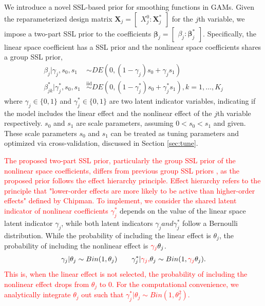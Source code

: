 \documentclass[AMA,STIX1COL,]{WileyNJD-v2}
\begin{document}
We introduce a novel SSL-based prior for smoothing functions in GAMs.
Given the reparameterized design matrix
\(\boldsymbol{X}_j = \begin{bmatrix} X^0_j : \boldsymbol{X}_j^*\end{bmatrix}\)
for the \(j\)th variable, we impose a two-part SSL prior to the
coefficients
\(\boldsymbol{\beta}_j = \begin{bmatrix} \beta_j : \boldsymbol{\beta}_j^*\end{bmatrix}\).
Specifically, the linear space coefficient has a SSL prior and the
nonlinear space coefficients shares a group SSL prior,
\begin{align}\label{eq:bham_ssl}
  \beta_{j} | \gamma_{j},s_0,s_1 &\sim DE(0,(1-\gamma_{j}) s_0 + \gamma_{j} s_1) \nonumber \\
  \beta^*_{jk} | \gamma^*_{j},s_0,s_1 &\overset{\text{iid}}{\sim}DE(0,(1-\gamma^*_{j}) s_0 + \gamma^*_{j} s_1), k=1,\dots, K_j
\end{align} where \(\gamma_{j}\in\{0,1\}\) and
\(\gamma^*_{j}\in \{0,1\}\) are two latent indicator variables,
indicating if the model includes the linear effect and the nonlinear
effect of the \(j\)th variable respectively. \(s_0\) and \(s_1\) are
scale parameters, assuming \(0 < s_0 < s_1\) and given. These scale
parameters \(s_0\) and \(s_1\) can be treated as tuning parameters and
optimized via cross-validation, discussed in Section \ref{sec:tune}.

\textcolor{red}{The proposed two-part SSL prior, particularly the group SSL prior of the nonlinear space coefficients, differs from previous group SSL priors \cite{Tang2018, Tang2019}, as the proposed prior follows the effect hierarchy principle. Effect hierarchy refers to the principle that "lower-order effects are more likely to be active than higher-order effects" defined by Chipman\cite{chipman2006prior}. To implement, we consider the shared latent indicator of nonlinear coefficients $\gamma^*_j$}
depends on the value of the linear space latent indicator \(\gamma_j\),
while both latent indicators \(\gamma_j and \gamma^*_j\) follow a
Bernoulli distribution. While the probability of including the linear
effect is \(\theta_j\), the probability of including the nonlinear
effect is \(\textcolor{red}{\gamma_{j}}\theta_j\). \[
\begin{aligned}
&\gamma_{j} | \theta_j \sim Bin(1, \theta_j) & & 
&\gamma_{j}^*| \textcolor{red}{\gamma_{j}, } \theta_j \sim Bin(1, \textcolor{red}{\gamma_{j}}\theta_j).
\end{aligned}
\]
\textcolor{red}{This is, when the linear effect is not selected, the probability of including the nonlinear effect drops from $\theta_j$ to 0. For the computational convenience, we analytically integrate $\theta_j$ out such that $\gamma_{j}^*| \theta_j \sim Bin(1, \theta_j^2)$.
}
\end{document}
